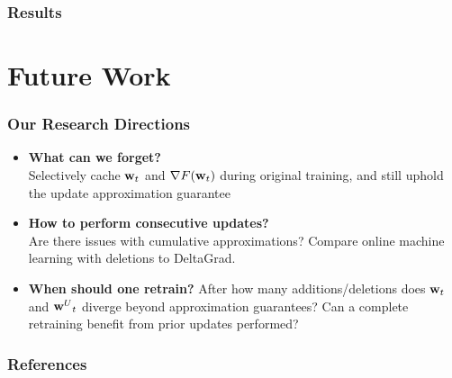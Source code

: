 \documentclass[pdf]{beamer}
\begin{document}
\begin{frame}
  \frametitle{Results}
  \label{results}
  
  \hyperlink{batch-performance}{}
  \hyperlink{Online-Performance}{}
  \hyperlink{large-deletions}{}
  \hyperlink{resnet-results}{}
\end{frame}


\section{Future Work}
\begin{frame}
  \frametitle{Our Research Directions}
  \begin{itemize}
    \item {\bf What can we forget?} \\
    Selectively cache $\textbf{w}_{t}$ and $\nabla F(\textbf{w}_{t})$ during original training, and still uphold the update approximation guarantee
    \item {\bf How to perform consecutive updates?}\\
    Are there issues with cumulative approximations? Compare online machine learning with deletions to DeltaGrad.
    \item {\bf When should one retrain?}
    After how many additions/deletions does $\textbf{w}_{t}$ and ${\textbf{w}^{U}}_{t}$ diverge beyond approximation guarantees? Can a complete retraining benefit from prior updates performed?
  \end{itemize}
  
  
\end{frame}

\begin{frame}[allowframebreaks]
  \frametitle{References}
  
  
\end{frame}

\appendix
\end{document}

